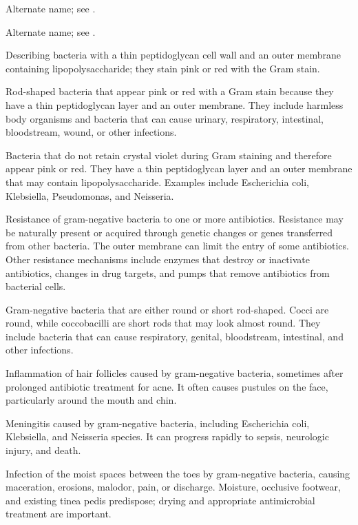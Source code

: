  Alternate name; see .

 Alternate name; see .

 Describing bacteria with a thin peptidoglycan cell wall and an outer membrane containing lipopolysaccharide; they stain pink or red with the Gram stain.

 Rod-shaped bacteria that appear pink or red with a Gram stain because they have a thin peptidoglycan layer and an outer membrane. They include harmless body organisms and bacteria that can cause urinary, respiratory, intestinal, bloodstream, wound, or other infections.

 Bacteria that do not retain crystal violet during Gram staining and therefore appear pink or red.
They have a thin peptidoglycan layer and an outer membrane that may contain
lipopolysaccharide. Examples include Escherichia coli, Klebsiella, Pseudomonas, and
Neisseria.

 Resistance of gram-negative bacteria to one or more antibiotics. Resistance may be naturally present or acquired through genetic changes or genes transferred from other bacteria. The outer membrane can limit the entry of some antibiotics. Other resistance mechanisms include enzymes that destroy or inactivate antibiotics, changes in drug targets, and pumps that remove antibiotics from bacterial cells.

 Gram-negative bacteria that are either round or short rod-shaped. Cocci are round, while coccobacilli are short rods that may look almost round. They include bacteria that can cause respiratory, genital, bloodstream, intestinal, and other infections.

 Inflammation of hair follicles caused by gram-negative bacteria, sometimes after prolonged antibiotic treatment for acne. It often causes pustules on the face, particularly around the mouth and chin.

 Meningitis caused by gram-negative bacteria, including Escherichia coli, Klebsiella, and Neisseria species. It can progress rapidly to sepsis, neurologic injury, and death.

 Infection of the moist spaces between the toes by gram-negative bacteria, causing maceration, erosions, malodor, pain, or discharge. Moisture, occlusive footwear, and existing tinea pedis predispose; drying and appropriate antimicrobial treatment are important.

